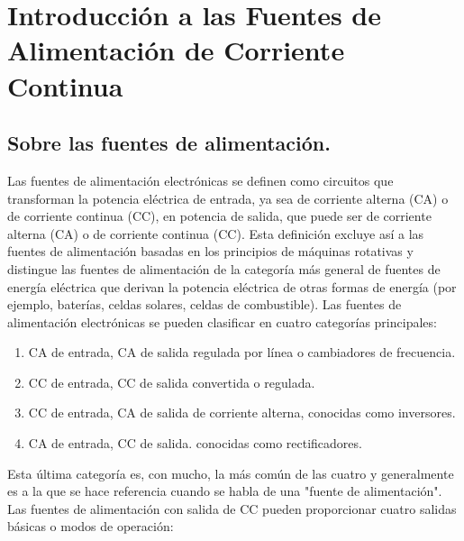 
\chapter{Introducción a las Fuentes de Alimentación de Corriente Continua}

\label{C:Fuentes de corriente continua}

\section{Sobre las fuentes de alimentación.} \par
Las fuentes de alimentación electrónicas se definen como circuitos que transforman la potencia eléctrica de entrada, ya sea de corriente alterna (CA) o de corriente continua (CC), en potencia de salida, que puede ser de corriente alterna (CA) o de corriente continua (CC). Esta definición excluye así a las fuentes de alimentación basadas en los principios de máquinas rotativas y distingue las fuentes de alimentación de la categoría más general de fuentes de energía eléctrica que derivan la potencia eléctrica de otras formas de energía (por ejemplo, baterías, celdas solares, celdas de combustible). Las fuentes de alimentación electrónicas se pueden clasificar en cuatro categorías principales:

\begin{enumerate}
    \item CA de entrada, CA de salida regulada por línea o cambiadores de frecuencia.
    \item CC de entrada, CC de salida convertida o regulada.
    \item CC de entrada, CA de salida de corriente alterna, conocidas como inversores.
    \item CA de entrada, CC de salida. conocidas como rectificadores.
\end{enumerate}

Esta última categoría es, con mucho, la más común de las cuatro y generalmente es a la que se hace referencia cuando se habla de una "fuente de alimentación". Las fuentes de alimentación con salida de CC pueden proporcionar cuatro salidas básicas o modos de operación:

